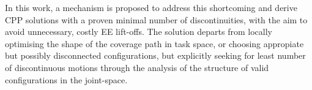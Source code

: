 \documentclass[journal]{IEEEtran}
\begin{document}
In this work, a mechanism is proposed to address this shortcoming and derive CPP solutions with a proven minimal number of discontinuities, with the aim to avoid unnecessary, costly EE lift-offs. 
The solution departs from locally optimising the shape of the coverage path in task space, or choosing appropiate but possibly disconnected configurations, but explicitly seeking for least number of discontinuous motions through the analysis of the structure of valid configurations in the joint-space. 
%

%
\end{document}
